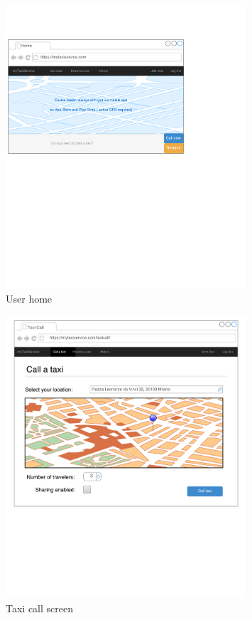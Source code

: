 \begin{figure}
\centering
\includegraphics[width=0.8\textwidth]{mockup/web/UserHome}
\caption{User home}
\label{fig:mockup-userhome}
\end{figure}

\begin{figure}
\centering
\includegraphics[width=0.8\textwidth]{mockup/web/TaxiCallBrowser}
\caption{Taxi call screen}
\label{fig:mockup-taxicall-browser}
\end{figure}

